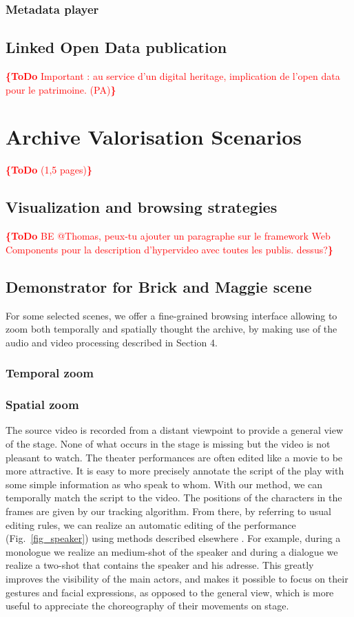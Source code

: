 \documentclass[conference]{IEEEtran}
\newcommand{\todo}[1]{\noindent\textcolor{red}{{\bf \{ToDo} #1{\bf \}}}}
\begin{document}
\subsubsection{Metadata player}

\subsection{Linked Open Data  publication}
\todo{Important : au service d'un digital heritage, implication de l'open data pour le patrimoine. (PA)}


\section{Archive Valorisation Scenarios}
\todo{(1,5 pages)}

\subsection{Visualization and browsing strategies}
\todo{BE @Thomas, peux-tu ajouter un paragraphe sur le framework Web Components pour la description d'hypervideo avec toutes les publis. dessus?}

\subsection{Demonstrator for Brick and Maggie scene}
For some selected scenes, we offer a fine-grained browsing interface allowing to zoom both temporally and spatially
thought the archive, by making use of the audio and video processing described in Section 4.  

\subsubsection{Temporal zoom}

\subsubsection{Spatial zoom}
The source video  is recorded from a distant viewpoint  to provide  a general  view of the stage.  None of what occurs in the stage is missing but the video is not pleasant to watch.  The theater performances are often edited like a movie to be more attractive.   It is easy to more precisely annotate the script of the play with some simple information as who speak to whom. With our method, we can temporally match the script to the video.  The positions of the characters in the frames are given by our tracking algorithm.  From there, by referring to usual editing rules, we can realize an automatic editing of the performance (Fig.~\ref{fig_speaker}) using methods described elsewhere \cite{Gandhi14}.  For example, during a monologue we realize an medium-shot of the speaker and during a dialogue we realize a two-shot that contains the speaker and his adresse. This greatly improves the visibility of the main actors, and makes it possible to focus on their gestures and facial expressions, as opposed to the general view, which is more useful to appreciate the choreography of their movements on stage.
\end{document}
